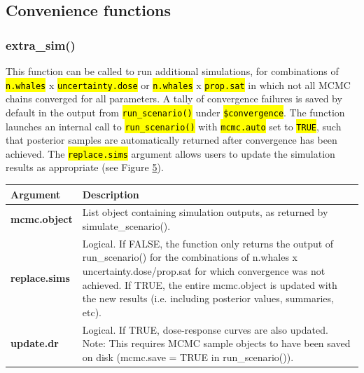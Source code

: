 \documentclass[
]{article}
\begin{document}
\subsection{Convenience functions}

\subsubsection{extra\_sim()}

This function can be called to run additional simulations, for combinations of \textcolor{codecolor}{\texttt{\hl{n.whales}}} x \textcolor{codecolor}{\texttt{\hl{uncertainty.dose}}} or \textcolor{codecolor}{\texttt{\hl{n.whales}}} x \textcolor{codecolor}{\texttt{\hl{prop.sat}}} in which not all MCMC chains converged for all parameters. A tally of convergence failures is saved by default in the output from \textcolor{codecolor}{\texttt{\hl{run\_scenario()}}} under \textcolor{codecolor}{\texttt{\hl{\$convergence}}}. The function launches an internal call to \textcolor{codecolor}{\texttt{\hl{run\_scenario()}}} with \textcolor{codecolor}{\texttt{\hl{mcmc.auto}}} set to \textcolor{codecolor}{\texttt{\hl{TRUE}}}, such that posterior samples are automatically returned after convergence has been achieved. The \textcolor{codecolor}{\texttt{\hl{replace.sims}}} argument allows users to update the simulation results as appropriate (see Figure \hyperlink{fig5}{5}).

\renewcommand{\arraystretch}{1.4}

\begin{longtable}{>{\bfseries}l|>{\raggedright\arraybackslash}p{30em}}
\toprule
\textbf{Argument} & \textbf{Description}\\
\midrule
mcmc.object & List object containing simulation outputs, as returned by simulate\_scenario().\\
replace.sims & Logical. If FALSE, the function only returns the output of run\_scenario() for the combinations of n.whales x uncertainty.dose/prop.sat for which convergence was not achieved. If TRUE, the entire mcmc.object is updated with the new results (i.e. including posterior values, summaries, etc).\\
update.dr & Logical. If TRUE, dose-response curves are also updated. Note: This requires MCMC sample objects to have been saved on disk (mcmc.save = TRUE in run\_scenario()).\\
\bottomrule
\end{longtable}
\end{document}
